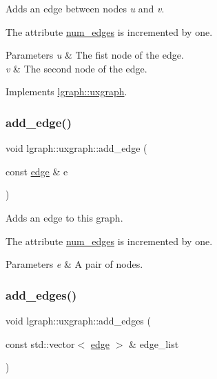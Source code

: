 Adds an edge between nodes {\itshape u} and {\itshape v}. 

The attribute \hyperlink{classlgraph_1_1xxgraph_a6765a9a3be42f6e0f824635c593b35d7}{num\+\_\+edges} is incremented by one.


\begin{DoxyParams}{Parameters}
{\em u} & The fist node of the edge. \\
\hline
{\em v} & The second node of the edge. \\
\hline
\end{DoxyParams}


Implements \hyperlink{classlgraph_1_1uxgraph_a5cf2ae9cf398b712fb9fe080b6976587}{lgraph\+::uxgraph}.

\mbox{\label{classlgraph_1_1uxgraph_a1a826ff50563bc4021e16d712f309232}} 
\subsubsection{\texorpdfstring{add\+\_\+edge()}{add\_edge()}\hspace{0.1cm}{\footnotesize\ttfamily [2/2]}}
{\footnotesize\ttfamily void lgraph\+::uxgraph\+::add\+\_\+edge (\begin{DoxyParamCaption}\item[{const \hyperlink{namespacelgraph_a76bd7d50719f03de7a85db259d80d572}{edge} \&}]{e }\end{DoxyParamCaption})\hspace{0.3cm}{\ttfamily [inherited]}}



Adds an edge to this graph. 

The attribute \hyperlink{classlgraph_1_1xxgraph_a6765a9a3be42f6e0f824635c593b35d7}{num\+\_\+edges} is incremented by one.


\begin{DoxyParams}{Parameters}
{\em e} & A pair of nodes. \\
\hline
\end{DoxyParams}
\mbox{\label{classlgraph_1_1uxgraph_ad20f841d6bb1147d087546c6054c55f3}} 
\subsubsection{\texorpdfstring{add\+\_\+edges()}{add\_edges()}}
{\footnotesize\ttfamily void lgraph\+::uxgraph\+::add\+\_\+edges (\begin{DoxyParamCaption}\item[{const std\+::vector$<$ \hyperlink{namespacelgraph_a76bd7d50719f03de7a85db259d80d572}{edge} $>$ \&}]{edge\+\_\+list }\end{DoxyParamCaption})\hspace{0.3cm}{\ttfamily [inherited]}}



